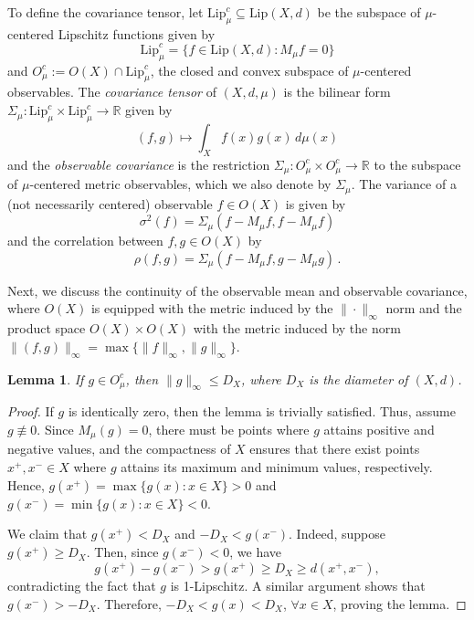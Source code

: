\documentclass[11pt]{article}
\newtheorem{lemma}[theorem]{Lemma}
\theoremstyle{definition}
\newcommand{\real}{\ensuremath{\mathbb{R}}}
\newcommand{\lip}{\ensuremath{\text{Lip}}}
\newcommand{\obs}[1]{\ensuremath{O(#1)}}
\newcommand{\cobs}[1]{\ensuremath{O^c_{#1}}}
\begin{document}
To define the covariance tensor, let $\lip^c_\mu \subseteq \lip (X,d)$ be the subspace of $\mu$-centered Lipschitz functions given by
\begin{equation}
\lip^c_\mu  = \{f \in \lip (X,d) \colon M_\mu f=0\}
\end{equation}
and $\cobs{\mu} := \obs{X} \cap \lip^c_\mu$, the closed and convex subspace of $\mu$-centered observables. The {\em covariance tensor} of $(X,d,\mu)$ is the bilinear form $\Sigma_\mu \colon \lip^c_\mu \times \lip^c_\mu \to \real$ given by
\begin{equation}
(f,g) \mapsto \int_X f(x) g(x) \, d\mu (x) 
\end{equation}
and the {\em observable covariance} is the restriction $\Sigma_\mu \colon \cobs{\mu} \times \cobs{\mu} \to \real$ to the subspace of $\mu$-centered metric observables, which we also denote by $\Sigma_\mu$. The variance of a (not necessarily centered) observable $f \in \obs{X}$ is given by
\begin{equation}
\sigma^2 (f) = \Sigma_\mu (f-M_\mu f, f-M_\mu f)
\end{equation}
and the correlation between $f,g \in \obs{X}$ by
\begin{equation}
\rho (f,g) = \Sigma_\mu (f-M_\mu f,g-M_\mu g) \,.
\end{equation}

Next, we discuss the continuity of the observable mean and observable covariance, where $\obs{X}$ is equipped with the metric induced by the $\|\cdot\|_\infty$ norm and the product space $\obs{X} \times \obs{X}$ with the metric induced by the norm $\|(f,g)\|_\infty = \max \{\|f\|_\infty, \|g\|_\infty\}$.

\begin{lemma} \label{L:bound}
If $g \in \cobs{\mu}$, then $\|g\|_\infty \leq D_X$, where $D_X$ is the diameter of $(X,d)$.
\end{lemma}

\begin{proof}
If $g$ is identically zero, then the lemma is trivially satisfied. Thus, assume $g \not\equiv 0$. Since $M_\mu(g)=0$, there must be points where $g$ attains positive and negative values, and the compactness of $X$ ensures that there exist points $x^+, x^- \in X$ where $g$ attains its maximum and minimum values, respectively. Hence, $g(x^+) = \max \{g(x) \colon x \in X\} >0$ and $g(x^-) = \min \{g(x) \colon x \in X\} <0$.

We claim that $g(x^+) < D_X$ and $-D_X < g(x^-)$. Indeed, suppose $g(x^+)\geq D_X$. Then, since $g(x^-)<0$, we have
\begin{equation}
g(x^+) - g(x^-) > g(x^+) \geq D_X \geq d(x^+, x^-),
\end{equation}
contradicting the fact that $g$ is 1-Lipschitz. A similar argument shows that $g(x^-) > -D_X$. Therefore, $-D_X < g(x) < D_X$, $\forall x \in X$, proving the lemma.
\end{proof}
\end{document}

